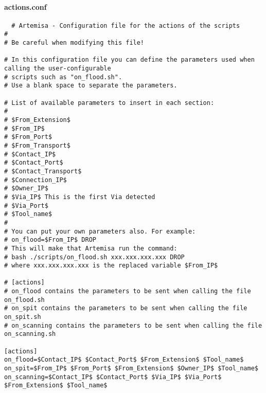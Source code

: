 \documentclass[a4paper,12pt]{report}
\newenvironment{myscriptlisting}
{\begin{list}{}{\setlength{\leftmargin}{1em}}\item\scriptsize\bfseries}
{\end{list}}
\begin{document}
\paragraph{actions.conf}
\begin{myscriptlisting}
 \begin{verbatim}
  # Artemisa - Configuration file for the actions of the scripts
#
# Be careful when modifying this file! 

# In this configuration file you can define the parameters used when
calling the user-configurable
# scripts such as "on_flood.sh".
# Use a blank space to separate the parameters.

# List of available parameters to insert in each section:
#
# $From_Extension$
# $From_IP$
# $From_Port$
# $From_Transport$
# $Contact_IP$
# $Contact_Port$
# $Contact_Transport$
# $Connection_IP$
# $Owner_IP$
# $Via_IP$ This is the first Via detected
# $Via_Port$
# $Tool_name$
#
# You can put your own parameters also. For example:
# on_flood=$From_IP$ DROP
# This will make that Artemisa run the command:
# bash ./scripts/on_flood.sh xxx.xxx.xxx.xxx DROP 
# where xxx.xxx.xxx.xxx is the replaced variable $From_IP$

# [actions]
# on_flood contains the parameters to be sent when calling the file
on_flood.sh
# on_spit contains the parameters to be sent when calling the file
on_spit.sh
# on_scanning contains the parameters to be sent when calling the file
on_scanning.sh

[actions]
on_flood=$Contact_IP$ $Contact_Port$ $From_Extension$ $Tool_name$
on_spit=$From_IP$ $From_Port$ $From_Extension$ $Owner_IP$ $Tool_name$
on_scanning=$Contact_IP$ $Contact_Port$ $Via_IP$ $Via_Port$
$From_Extension$ $Tool_name$
 \end{verbatim}
\end{myscriptlisting}
\end{document}
